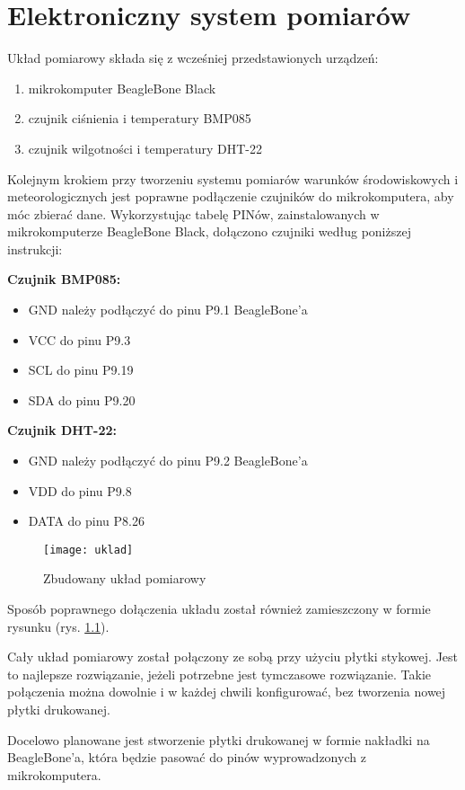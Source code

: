 \chapter{Elektroniczny system pomiarów}
Układ pomiarowy składa się z wcześniej przedstawionych urządzeń:

\begin{enumerate}
\setlength{\itemsep}{2pt} 
\setlength{\parskip}{2pt} 
\setlength{\parsep}{2pt}
\item mikrokomputer BeagleBone Black
\item czujnik ciśnienia i temperatury BMP085
\item czujnik wilgotności i temperatury DHT-22
\end{enumerate}

Kolejnym krokiem przy tworzeniu systemu pomiarów warunków środowiskowych i meteorologicznych jest poprawne podłączenie czujników do mikrokomputera, aby móc zbierać dane. Wykorzystując tabelę PINów, zainstalowanych w mikrokomputerze BeagleBone Black, dołączono czujniki według poniższej instrukcji:

\textbf{Czujnik BMP085:}
\begin{itemize}
\setlength{\itemsep}{2pt} 
\setlength{\parskip}{2pt} 
\setlength{\parsep}{2pt}
\item GND należy podłączyć do pinu P9.1 BeagleBone'a
\item VCC do pinu P9.3
\item SCL do pinu P9.19
\item SDA do pinu P9.20
\end{itemize}

\textbf{Czujnik DHT-22:}
\begin{itemize}
\setlength{\itemsep}{2pt} 
\setlength{\parskip}{2pt} 
\setlength{\parsep}{2pt}
\item GND należy podłączyć do pinu P9.2 BeagleBone'a
\item VDD do pinu P9.8
\item DATA do pinu P8.26
\end{itemize}

\begin{figure}[h!]
\centering
\texttt{[image: uklad]}
\caption{Zbudowany układ pomiarowy}
\label{fig:uklad}
\end{figure}

Sposób poprawnego dołączenia układu został również zamieszczony w formie rysunku (rys. \ref{fig:uklad}).

Cały układ pomiarowy został połączony ze sobą przy użyciu płytki stykowej. Jest to najlepsze rozwiązanie, jeżeli potrzebne jest tymczasowe rozwiązanie. Takie połączenia można dowolnie i w każdej chwili konfigurować, bez tworzenia nowej płytki drukowanej.

Docelowo planowane jest stworzenie płytki drukowanej w formie nakładki na BeagleBone'a, która będzie pasować do pinów wyprowadzonych z mikrokomputera.